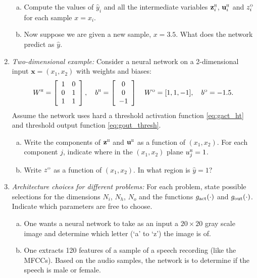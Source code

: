 \documentclass[11pt]{article}
\def\x{\times}
\newcommand{\ubf}{\mathbf{u}}
\newcommand{\xbf}{\mathbf{x}}
\newcommand{\zbf}{\mathbf{z}}
\def\hid{\textsc{\tiny H}}
\def\out{\textsc{\tiny O}}
\begin{document}
\begin{enumerate}
\begin{enumerate}[(a)]
\item Compute the values of $\hat{y}_i$ and all
the intermediate variables $\zbf_i^\hid$,
$\ubf_i^\hid$ and $z^\out_i$ for each sample $x=x_i$.

\item Now suppose we are given a new sample, $x=3.5$.  What does the network
predict as $\hat{y}$.
\end{enumerate}

\item \emph{Two-dimensional example:} Consider a neural network
on a 2-dimensional input $\xbf=(x_1,x_2)$ with weights and biases:
\[
    W^\hid = \left[ \begin{array}{cc} 1 & 0 \\ 0 & 1 \\ 1 & 1 \end{array} \right], \quad
    b^\hid = \left[ \begin{array}{c} 0 \\ 0 \\ -1 \end{array} \right] \quad
    W^\out = [1, 1, -1], \quad b^\out = -1.5.
\]
Assume the network uses hard a
threshold activation function \eqref{eq:gact_ht} and
threshold output function \eqref{eq:gout_thresh}.
\begin{enumerate}[(a)]
\item Write the components of $\zbf^\hid$ and $\ubf^\hid$ as a function
of $(x_1,x_2)$.  For each component $j$, indicate where in the $(x_1,x_2)$
plane $u^\hid_j=1$.

\item Write $z^\out$ as a function of $(x_1,x_2)$.  In what region is
$\hat{y}=1$?
\end{enumerate}

\item \emph{Architecture choices for different problems:}
For each problem, state possible selections for the dimensions
$N_i$, $N_h$, $N_o$ and the functions $g_{\rm act}(\cdot)$ and
$g_{\rm out}(\cdot)$.   Indicate which parameters are free to choose.
\begin{enumerate}[(a)]
\item One wants a neural network to take as an input a $20 \x 20$
gray scale image and determine which letter (`a' to `z')
the image is of.

\item One extracts 120 features of a sample of a
speech recording (like the MFCCs).
Based on the audio samples, the network is to determine if the speech
is male or female.


\end{enumerate}
\end{enumerate}
\end{document}
